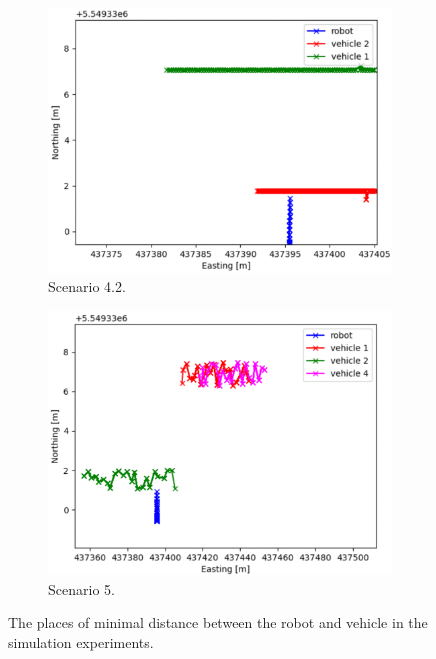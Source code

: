 \begin{figure}[H]
\begin{subfigure}{0.49\linewidth}
                \includegraphics[width=\linewidth]{images/simulations/closest_4_2.png}
                \caption{Scenario 4.2.}
            \end{subfigure}
            \begin{subfigure}{0.49\linewidth}
                \centering
                \includegraphics[width=\linewidth]{images/simulations/closest_5.png}
                \caption{Scenario 5.}
            \end{subfigure}
            \caption{The places of minimal distance between the robot and vehicle in the simulation experiments.}
            \label{fig:closest}
        \end{figure}

